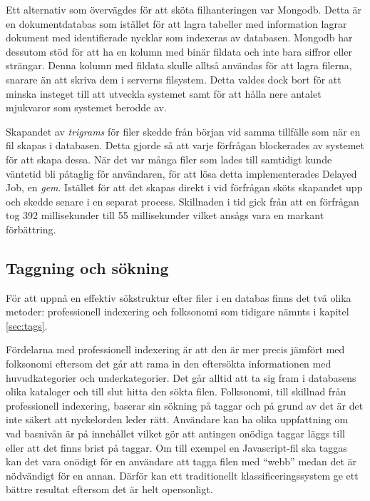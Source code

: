 Ett alternativ som övervägdes för att sköta filhanteringen var Mongodb. Detta är en dokumentdatabas som istället för att lagra tabeller med information lagrar dokument med identifierade nycklar som indexeras av databasen. Mongodb har dessutom stöd för att ha en kolumn med binär fildata och inte bara siffror eller strängar. Denna kolumn med fildata skulle alltså användas för att lagra filerna, snarare än att skriva dem i serverns filsystem. Detta valdes dock bort för att minska insteget till att utveckla systemet samt för att hålla nere antalet mjukvaror som systemet berodde av.

Skapandet av \emph{trigrams} för filer skedde från början vid samma tillfälle
som när en fil skapas i databasen. Detta gjorde så att varje förfrågan
blockerades av systemet för att skapa dessa. När det var många filer som lades
till samtidigt kunde väntetid bli påtaglig för användaren, för att lösa detta
implementerades Delayed Job, en \emph{gem}. Istället för att det skapas direkt
i vid förfrågan sköts skapandet upp och skedde senare i en separat process.
Skillnaden i tid gick från att en förfrågan tog 392 millisekunder till 55
millisekunder vilket ansågs vara en markant förbättring.

\subsection{Taggning och sökning}

För att uppnå en effektiv sökstruktur efter filer i en databas finns det två olika metoder: professionell indexering och folksonomi som tidigare nämnts i kapitel \ref{sec:tags}.

Fördelarna med professionell indexering är att den är mer precis jämfört med
folksonomi eftersom det går att rama in den eftersökta informationen med
huvudkategorier och underkategorier. Det går alltid att ta sig fram i
databasens olika kataloger och till slut hitta den sökta filen. Folksonomi,
till skillnad från professionell indexering, baserar sin sökning på taggar och
på grund av det är det inte säkert att nyckelorden leder rätt. Användare kan ha
olika uppfattning om vad basnivån är på innehållet vilket gör att antingen
onödiga taggar läggs till eller att det finns brist på taggar. Om till exempel
en Javascript-fil ska taggas kan det vara onödigt för en användare att tagga
filen med ``webb'' medan det är nödvändigt för en annan. Därför kan ett
traditionellt klassificeringssystem ge ett bättre resultat eftersom det är helt
opersonligt.

